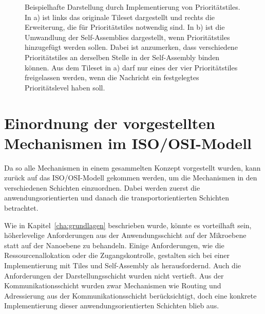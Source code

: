 \begin{figure}
    \centering 
    \caption[Priorität Beispiel]{Beispielhafte Darstellung durch Implementierung von Prioritätstiles. In a) ist links das originale Tileset dargestellt und rechts die Erweiterung, die für Prioritätstiles notwendig sind. In b) ist die Umwandlung der Self-Assemblies dargestellt, wenn Prioritätstiles hinzugefügt werden sollen. Dabei ist anzumerken, dass verschiedene Prioritätstiles an derselben Stelle in der Self-Assembly binden können. Aus dem Tileset in a) darf nur eines der vier Prioritätstiles freigelassen werden, wenn die Nachricht ein festgelegtes Prioritätslevel haben soll.}
    \label{fig:prio}
\end{figure}

\section{Einordnung der vorgestellten Mechanismen im ISO/OSI-Modell}

Da so alle Mechanismen in einem gesammelten Konzept vorgestellt wurden, kann zurück auf das ISO/OSI-Modell gekommen werden, um die Mechanismen in den verschiedenen Schichten einzuordnen. Dabei werden zuerst die anwendungsorientierten  und danach die transportorientierten Schichten betrachtet.

Wie in Kapitel~\ref{cha:grundlagen} beschrieben wurde, könnte es vorteilhaft sein, höherlevelige Anforderungen aus der Anwendungsschicht auf der Mikroebene statt auf der Nanoebene zu behandeln. Einige Anforderungen, wie die Ressourcenallokation oder die Zugangskontrolle, gestalten sich bei einer Implementierung mit Tiles und Self-Assembly als herausfordernd. Auch die Anforderungen der Darstellungsschicht wurden nicht vertieft. Aus der Kommunikationsschicht wurden zwar Mechanismen wie Routing und Adressierung aus der Kommunikationsschicht berücksichtigt, doch eine konkrete Implementierung dieser anwendungsorientierten Schichten blieb aus.

